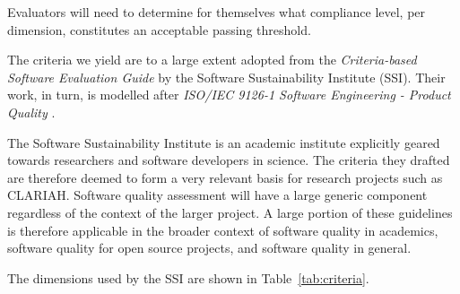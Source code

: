 \documentclass[a4paper,11pt]{article}
\begin{document}
Evaluators will need to determine for themselves what compliance level, per
dimension, constitutes an acceptable passing threshold.

The criteria we yield are  to a large extent adopted from the
\emph{Criteria-based Software Evaluation Guide} \citep{SSIGUIDE} by the Software
Sustainability Institute (SSI). Their work, in turn, is modelled after
\emph{ISO/IEC 9126-1 Software Engineering - Product Quality} \citep{ISO9126}.
%
%
%

The Software Sustainability Institute\citep{SSIGENERAL} is an academic institute
explicitly geared towards researchers and software developers in science. The
criteria they drafted are therefore deemed to form a very relevant basis for
research projects such as CLARIAH. Software quality assessment will have a
large generic component regardless of the context of the larger project. A
large portion of these guidelines is therefore applicable in the broader context
of software quality in academics, software quality for open source projects, and
software quality in general.

The dimensions used by the SSI are shown in Table~\ref{tab:criteria}.
\end{document}
